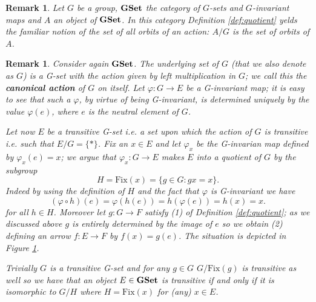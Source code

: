 \documentclass[italian, 12pt, reqno]{article}
\theoremstyle{myteo}
\newtheorem{remark}[theorem]{Remark}
\numberwithin{equation}{section}
\newcommand{\gset}{\text{\textbf{GSet}}}
\newcommand{\fix}[1]{\text{Fix}(#1)}
\newcommand{\fun}[3]{#1\colon#2\to #3}
\begin{document}
\begin{remark}
  \label{rem:orbits}
  Let \(G\) be a group, \(\gset\) the category of \(G\)-sets and \(G\)-invariant maps and \(A\) an object of \(\gset\).
  In this category Definition \ref{def:quotient} yelds the familiar notion of the set of all orbits of an action: \(A/G\) is the set of orbits of \(A\).
\end{remark}

\begin{remark}
  \label{rem:transitive_actions}
  Consider again \(\gset\).
  The underlying set of \(G\) (that we also denote as \(G\)) is a G-set with the action given by left multiplication in \(G\); we call this the \textbf{canonical action} of \(G\) on itself.
  Let \(\fun{\varphi}{G}{E}\) be a G-invariant map; it is easy to see that such a \(\varphi\), by virtue of being G-invariant, is determined uniquely by the value \(\varphi(e)\), where \(e\) is the neutral element of \(G\).

  Let now \(E\) be a transitive G-set i.e. a set upon which the action of \(G\) is transitive i.e. such that \(E/G = \{*\}\).
  Fix an \(x\in E\) and let \(\varphi_x\) be the G-invarian map defined by \(\varphi_x(e) = x\); we argue that \(\fun{\varphi_x}{G}{E}\) makes \(E\) into a quotient of \(G\) by the subgroup
  \[H = \fix{x} = \{g\in G\colon gx = x\}.\]
  Indeed by using the definition of \(H\) and the fact that \(\varphi\) is G-invariant we have
  \[(\varphi\circ h)(e) = \varphi(h(e)) = h(\varphi(e)) = h(x) = x.\]
  for all \(h\in H\).
  Moreover let \(\fun{g}{G}{F}\) satisfy (1) of Definition \ref{def:quotient}; as we discussed above \(g\) is entirely determined by the image of \(e\) so we obtain (2) defining an arrow \(\fun{f}{E}{F}\) by \(f(x) = g(e)\).
  The situation is depicted in Figure \ref{diagram:transitive_actions}.

  Trivially \(G\) is a transitive G-set and for any \(g\in G\) \(G/\fix{g}\) is transitive as well so we have that an object \(E\in\gset\) is transitive if and only if it is isomorphic to \(G/H\) where \(H = \fix{x}\) for (any) \(x\in E\).
\end{remark}

\begin{figure}
  \begin{center}
  \end{center}
  \caption{}
  \label{diagram:transitive_actions}
\end{figure}
\end{document}
